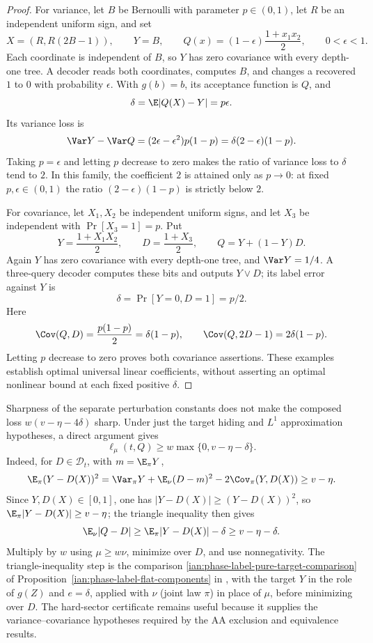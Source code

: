 \begin{proof}
For variance, let \(B\) be Bernoulli with parameter \(p\in(0,1)\), let \(R\) be an independent uniform sign, and set
\[
 X=(R,R(2B-1)),\qquad Y=B,\qquad
 Q(x)=(1-\epsilon)\frac{1+x_1x_2}{2},
 \qquad 0<\epsilon<1.
\]
Each coordinate is independent of \(B\), so \(Y\) has zero covariance with every depth-one tree.
A decoder reads both coordinates, computes \(B\), and changes a recovered \(1\) to \(0\) with probability \(\epsilon\).
With \(g(b)=b\), its acceptance function is \(Q\), and
\[
 \delta=\E|Q(X)-Y|=p\epsilon.
\]
Its variance loss is
\[
 \Var Y-\Var Q
 =(2\epsilon-\epsilon^2)p(1-p)
 =\delta(2-\epsilon)(1-p).
\]
Taking \(p=\epsilon\) and letting \(p\) decrease to zero makes the ratio of variance loss to \(\delta\) tend to \(2\).
In this family, the coefficient \(2\) is attained only as \(p\to0\): at fixed \(p,\epsilon\in(0,1)\) the ratio \((2-\epsilon)(1-p)\) is strictly below \(2\).

For covariance, let \(X_1,X_2\) be independent uniform signs, and let \(X_3\) be independent with \(\Pr[X_3=1]=p\).
Put
\[
 Y=\frac{1+X_1X_2}{2},\qquad
 D=\frac{1+X_3}{2},\qquad
 Q=Y+(1-Y)D.
\]
Again \(Y\) has zero covariance with every depth-one tree, and \(\Var Y=1/4\).
A three-query decoder computes these bits and outputs \(Y\lor D\); its label error against \(Y\) is
\[
 \delta=\Pr[Y=0,D=1]=p/2.
\]
Here
\[
 \Cov(Q,D)=\frac{p(1-p)}2=\delta(1-p),
 \qquad
 \Cov(Q,2D-1)=2\delta(1-p).
\]
Letting \(p\) decrease to zero proves both covariance assertions.
These examples establish optimal universal linear coefficients, without asserting an optimal nonlinear bound at each fixed positive \(\delta\).
\end{proof}

\begin{remark}
\label{ian:robust-compilation-direct-loss}
Sharpness of the separate perturbation constants does not make the composed loss \(w(v-\eta-4\delta)\) sharp.
Under just the target hiding and \(L^1\) approximation hypotheses, a direct argument gives
\[
 \ell_\mu(t,Q)\ge w\max\{0,v-\eta-\delta\}.
\]
Indeed, for \(D\in\mathcal D_t\), with \(m=\E_\pi Y\),
\[
 \E_\pi(Y-D(X))^2
 =\Var_\pi Y+\E_\nu(D-m)^2
   -2\Cov_\pi(Y,D(X))
 \ge v-\eta.
\]
Since \(Y,D(X)\in[0,1]\), one has \(|Y-D(X)|\ge(Y-D(X))^2\), so \(\E_\pi|Y-D(X)|\ge v-\eta\); the triangle inequality then gives
\[
 \E_\nu|Q-D|
 \ge\E_\pi|Y-D(X)|-\delta
 \ge v-\eta-\delta.
\]
Multiply by \(w\) using \(\mu\ge w\nu\), minimize over \(D\), and use nonnegativity.
The triangle-inequality step is the comparison \eqref{ian:phase-label-pure-target-comparison} of
Proposition~\ref{ian:phase-label-flat-components} in
, with the target \(Y\) in the role of \(g(Z)\) and \(e=\delta\), applied with \(\nu\) (joint law \(\pi\)) in place of \(\mu\), before minimizing over \(D\).
The hard-sector certificate remains useful because it supplies the variance--covariance hypotheses required by the AA exclusion and equivalence results.
\end{remark}

